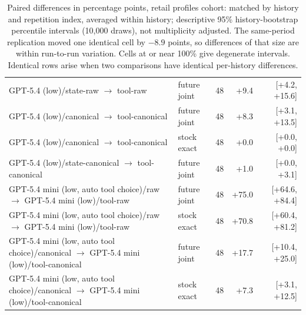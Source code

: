 \begin{table}[htbp]
{\begin{tabular}{lllrr}
GPT-5.4 (low)/state-raw $\to$ tool-raw & future joint & 48 & +9.4 & [+4.2, +15.6] \\
GPT-5.4 (low)/canonical $\to$ tool-canonical & future joint & 48 & +8.3 & [+3.1, +13.5] \\
GPT-5.4 (low)/canonical $\to$ tool-canonical & stock exact & 48 & +0.0 & [+0.0, +0.0] \\
GPT-5.4 (low)/state-canonical $\to$ tool-canonical & future joint & 48 & +1.0 & [+0.0, +3.1] \\
GPT-5.4 mini (low, auto tool choice)/raw $\to$ GPT-5.4 mini (low)/tool-raw & future joint & 48 & +75.0 & [+64.6, +84.4] \\
GPT-5.4 mini (low, auto tool choice)/raw $\to$ GPT-5.4 mini (low)/tool-raw & stock exact & 48 & +70.8 & [+60.4, +81.2] \\
GPT-5.4 mini (low, auto tool choice)/canonical $\to$ GPT-5.4 mini (low)/tool-canonical & future joint & 48 & +17.7 & [+10.4, +25.0] \\
GPT-5.4 mini (low, auto tool choice)/canonical $\to$ GPT-5.4 mini (low)/tool-canonical & stock exact & 48 & +7.3 & [+3.1, +12.5] \\
\bottomrule
\end{tabular}}
\caption{Paired differences in percentage points, retail profiles cohort: matched by history and repetition index, averaged within history; descriptive 95\% history-bootstrap percentile intervals (10,000 draws), not multiplicity adjusted. The same-period replication moved one identical cell by $-8.9$ points, so differences of that size are within run-to-run variation. Cells at or near 100\% give degenerate intervals. Identical rows arise when two comparisons have identical per-history differences.}
\label{tab:extpaired_profiles}
\end{table}
